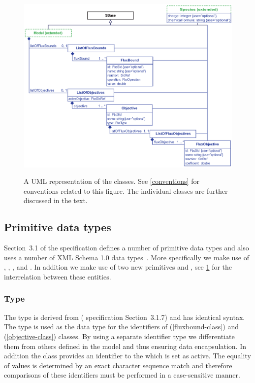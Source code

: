 \begin{figure}[h]
  \centering
  \includegraphics[width=\textwidth]{images/fbc_uml.pdf}\\
  \caption{A UML representation of the \FBCPackage classes. See
  \ref{conventions} for conventions related to this figure. The individual
  classes are further discussed in the text.}
  \label{fig:fbc_uml}
\end{figure}

\subsection{Primitive data types}
\label{primtypes}

Section~3.1 of the \sbmlthreecore specification defines a number of
primitive data types and also uses a number of XML Schema 1.0 data
types~\citep{biron:2000}.  More specifically we make use of 
, , ,  
and . In addition we make use of two new primitives 
 and , see \ref{fig:fbc_uml} for the 
interrelation between these entities.

\subsubsection{Type }
\label{primtype-fbcsid}

The type  is derived from  (\sbmlthreecore
specification Section~3.1.7) and has identical syntax. The  
type is used as the data type for the identifiers of \FluxBound 
(\ref{fluxbound-class}) and \Objective (\ref{objective-class}) classes. By 
using a separate identifier type we differentiate them from others defined 
in the \SBML model and thus ensuring data encapsulation. In addition the 
\Objective class  provides an identifier to the \Objective 
which is set as active. The equality of  values is
determined by an exact character sequence match and therefore comparisons of 
these identifiers must be performed in a case-sensitive manner.

